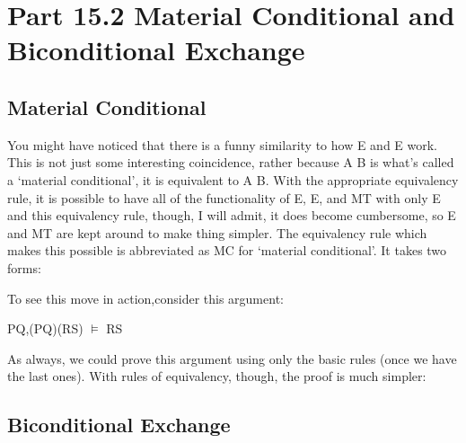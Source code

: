 \section{Part 15.2 Material Conditional and Biconditional Exchange}
\subsection{Material Conditional}

You might have noticed that there is a funny similarity to how \eif E and \eor E work. This is not just some interesting coincidence, rather because A \eif  B is what's called a `material conditional', it is equivalent to \enot A \eor  B. With the appropriate equivalency rule, it is possible to have all of the functionality of \eor E, \eif E, and MT with only \eor E and this equivalency rule, though, I will admit, it does become cumbersome, so \eif E and MT are kept around to make thing simpler. The equivalency rule which makes this possible is abbreviated as MC for `material conditional'. It takes two forms:

To see this move in action,consider this argument:
\begin{center}
\enot P\eor Q,(P\eif Q)\eif (\enot R\eif S) $\vDash$ R\eor S
\end{center}
As always, we could prove this argument using only the basic rules (once we have the last ones). With rules of equivalency, though, the proof is much simpler:
\begin{fitchproof}
\end{fitchproof}	
\subsection{Biconditional Exchange}

